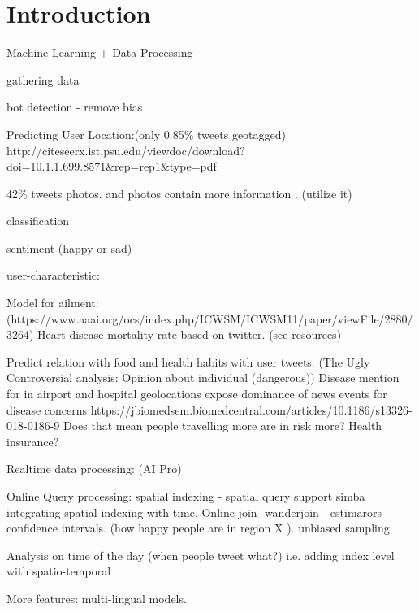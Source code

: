 \section*{Introduction}
\label{sec:intro}
Machine Learning  +  Data Processing

gathering data

bot detection - remove bias

Predicting User Location:(only 0.85\% tweets geotagged) http://citeseerx.ist.psu.edu/viewdoc/download?doi=10.1.1.699.8571&rep=rep1&type=pdf

42\% tweets photos. and photos contain more information . (utilize it)

classification

sentiment (happy or sad)

user-characteristic:

Model for ailment: (https://www.aaai.org/ocs/index.php/ICWSM/ICWSM11/paper/viewFile/2880/3264)
Heart disease mortality rate based on twitter. (see resources)

Predict relation with food and health habits with user tweets. (The Ugly Controversial analysis: Opinion about individual (dangerous))
  Disease mention for
  in airport and hospital geolocations expose dominance of news events for disease concerns
  https://jbiomedsem.biomedcentral.com/articles/10.1186/s13326-018-0186-9
  Does that mean people travelling more are in risk more? Health insurance?


Realtime data processing:  (AI Pro)

Online Query processing:
  spatial indexing - spatial query support simba
  integrating spatial indexing with time.
  Online join- wanderjoin - estimarors - confidence intervals. (how happy people  are in region X ).
  unbiased sampling

  Analysis on time of the day  (when people tweet what?) i.e. adding index level with spatio-temporal


More features:
multi-lingual models.





